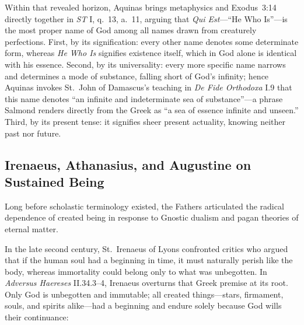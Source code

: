 Within that revealed horizon, Aquinas brings metaphysics and Exodus~3:14 directly together in \emph{ST} I, q.\ 13, a.\ 11, arguing that \emph{Qui Est}---``He Who Is''---is the most proper name of God among all names drawn from creaturely perfections. First, by its signification: every other name denotes some determinate form, whereas \emph{He Who Is} signifies existence itself, which in God alone is identical with his essence. Second, by its universality: every more specific name narrows and determines a mode of substance, falling short of God's infinity; hence Aquinas invokes St.\ John of Damascus's teaching in \emph{De Fide Orthodoxa} I.9 that this name denotes ``an infinite and indeterminate sea of substance''---a phrase Salmond renders directly from the Greek as ``a sea of essence infinite and unseen.'' Third, by its present tense: it signifies sheer present actuality, knowing neither past nor future.

\subsection{Irenaeus, Athanasius, and Augustine on Sustained Being}

Long before scholastic terminology existed, the Fathers articulated the radical dependence of created being in response to Gnostic dualism and pagan theories of eternal matter.

In the late second century, St.\ Irenaeus of Lyons confronted critics who argued that if the human soul had a beginning in time, it must naturally perish like the body, whereas immortality could belong only to what was unbegotten. In \emph{Adversus Haereses} II.34.3--4, Irenaeus overturns that Greek premise at its root. Only God is unbegotten and immutable; all created things---stars, firmament, souls, and spirits alike---had a beginning and endure solely because God wills their continuance:

